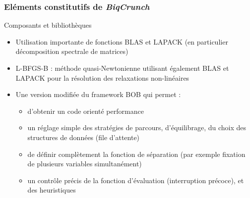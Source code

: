 \documentclass{beamer}
\def\bleu#1{{\color{blue}#1}}
\newcommand{\biqcrunch}{\emph{\mbox{BiqCrunch}}}
\begin{document}
\begin{frame}
\frametitle{Eléments constitutifs de \biqcrunch}

\begin{block}{Composants et bibliothèques}

\begin{itemize}
\item Utilisation importante de \bleu{fonctions BLAS et LAPACK} (en particulier décomposition spectrale de matrices)
\item L-BFGS-B : \bleu{méthode quasi-Newtonienne} utilisant également BLAS et LAPACK pour la résolution des relaxations non-linéaires
\item Une version modifiée du \bleu{framework BOB} qui permet :
\begin{itemize}
\item d'obtenir un code orienté performance
\item un \bleu{réglage simple} des stratégies de parcours, d'équilibrage, du choix des structures de données (file d'attente)
\item de définir complètement la fonction de \bleu{séparation} (par exemple fixation de plusieurs variables simultanément)
\item  un contrôle précis de la fonction d'\bleu{évaluation} (interruption précoce), et des heuristiques
\end{itemize}

\end{itemize}
\end{block}
\end{frame}
\end{document}
